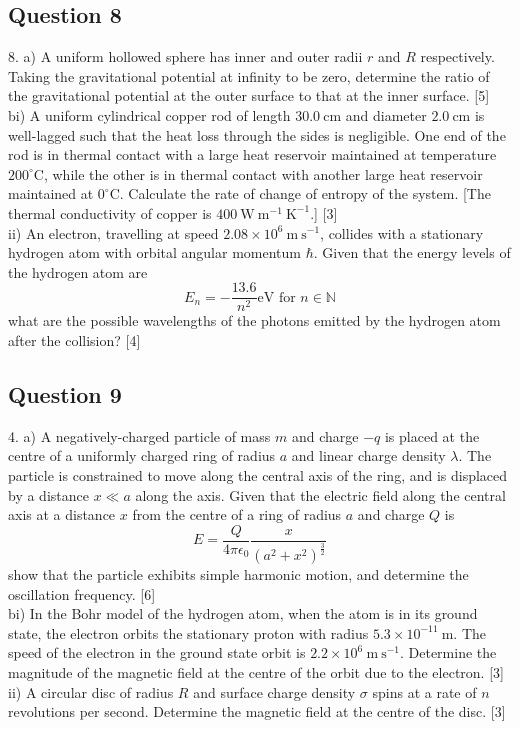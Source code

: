 \documentclass{article}
\begin{document}
\subsection{Question 8}
8. a) A uniform hollowed sphere has inner and outer radii $r$ and $R$ respectively. Taking the gravitational potential at infinity to be zero, determine the ratio of the gravitational potential at the outer surface to that at the inner surface. [5] \\
bi) A uniform cylindrical copper rod of length $30.0 \mathrm{~cm}$ and diameter $2.0 \mathrm{~cm}$ is well-lagged such that the heat loss through the sides is negligible. One end of the rod is in thermal contact with a large heat reservoir maintained at temperature $200^{\circ} \mathrm{C}$, while the other is in thermal contact with another large heat reservoir maintained at $0^{\circ} \mathrm{C}$. Calculate the rate of change of entropy of the system. [The thermal conductivity of copper is $400 \mathrm{~W} \mathrm{~m}^{-1} \mathrm{~K}^{-1}$.] [3]  \\
ii) An electron, travelling at speed $2.08 \times 10^{6} \mathrm{~m} \mathrm{~s}^{-1}$, collides with a stationary hydrogen atom with orbital angular momentum $\hbar .$ Given that the energy levels of the hydrogen atom are
$$
E_{n}=-\frac{13.6}{n^{2}} \mathrm{eV} \text { for } n \in \mathbb{N}
$$
what are the possible wavelengths of the photons emitted by the hydrogen atom after the collision? [4] \\

\subsection{Question 9}
4. a) A negatively-charged particle of mass $m$ and charge $-q$ is placed at the centre of a uniformly charged ring of radius $a$ and linear charge density $\lambda$. The particle is constrained to move along the central axis of the ring, and is displaced by a distance $x \ll a$ along the axis. Given that the electric field along the central axis at a distance $x$ from the centre of a ring of radius $a$ and charge $Q$ is
$$
E=\frac{Q}{4 \pi \epsilon_{0}} \frac{x}{\left(a^{2}+x^{2}\right)^{\frac{3}{2}}}
$$
show that the particle exhibits simple harmonic motion, and determine the oscillation frequency. [6] \\
bi) In the Bohr model of the hydrogen atom, when the atom is in its ground state, the electron orbits the stationary proton with radius $5.3 \times 10^{-11} \mathrm{~m}$. The speed of the electron in the ground state orbit is $2.2 \times 10^{6} \mathrm{~m} \mathrm{~s}^{-1}$. Determine the magnitude of the magnetic field at the centre of the orbit due to the electron. [3] \\
ii) A circular disc of radius $R$ and surface charge density $\sigma$ spins at a rate of $n$ revolutions per second. Determine the magnetic field at the centre of the disc. [3]
\end{document}
